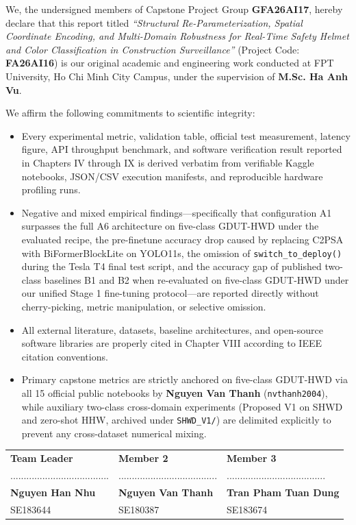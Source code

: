 We, the undersigned members of Capstone Project Group \textbf{GFA26AI17}, hereby declare that this report titled \textit{``Structural Re-Parameterization, Spatial Coordinate Encoding, and Multi-Domain Robustness for Real-Time Safety Helmet and Color Classification in Construction Surveillance''} (Project Code: \textbf{FA26AI16}) is our original academic and engineering work conducted at FPT University, Ho Chi Minh City Campus, under the supervision of \textbf{M.Sc. Ha Anh Vu}.

We affirm the following commitments to scientific integrity:
\begin{itemize}[leftmargin=1.8em, itemsep=4pt]
  \item Every experimental metric, validation table, official test measurement, latency figure, API throughput benchmark, and software verification result reported in Chapters IV through IX is derived verbatim from verifiable Kaggle notebooks, JSON/CSV execution manifests, and reproducible hardware profiling runs.
  \item Negative and mixed empirical findings---specifically that configuration A1 surpasses the full A6 architecture on five-class GDUT-HWD under the evaluated recipe, the pre-finetune accuracy drop caused by replacing C2PSA with BiFormerBlockLite on YOLO11s, the omission of \nolinkurl{switch_to_deploy()} during the Tesla T4 final test script, and the accuracy gap of published two-class baselines B1 and B2 when re-evaluated on five-class GDUT-HWD under our unified Stage 1 fine-tuning protocol---are reported directly without cherry-picking, metric manipulation, or selective omission.
  \item All external literature, datasets, baseline architectures, and open-source software libraries are properly cited in Chapter VIII according to IEEE citation conventions.
  \item Primary capstone metrics are strictly anchored on five-class GDUT-HWD via all 15 official public notebooks by \textbf{Nguyen Van Thanh} (\texttt{nvthanh2004}), while auxiliary two-class cross-domain experiments (Proposed V1 on SHWD and zero-shot HHW, archived under \texttt{SHWD\_V1/}) are delimited explicitly to prevent any cross-dataset numerical mixing.
\end{itemize}

\vspace{24pt}
\noindent
\begin{tabularx}{\textwidth}{>{\centering\arraybackslash}X>{\centering\arraybackslash}X>{\centering\arraybackslash}X}
\textbf{Team Leader} & \textbf{Member 2} & \textbf{Member 3} \\[30pt]
..................................... & ..................................... & ..................................... \\
\textbf{Nguyen Han Nhu} & \textbf{Nguyen Van Thanh} & \textbf{Tran Pham Tuan Dung} \\
SE183644 & SE180387 & SE183674 \\
\end{tabularx}

